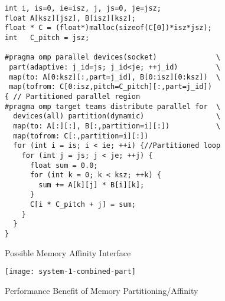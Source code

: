 \begin{figure}
  \begin{verbatim}
int i, is=0, ie=isz, j, js=0, je=jsz;
float A[ksz][jsz], B[isz][ksz];
float * C = (float*)malloc(sizeof(C[0])*isz*jsz);
int   C_pitch = jsz;

#pragma omp parallel devices(socket)              \
 part(adaptive: j_id=js; j_id<je; ++j_id)         \
 map(to: A[0:ksz][:,part=j_id], B[0:isz][0:ksz])  \
 map(tofrom: C[0:isz,pitch=C_pitch][:,part=j_id])
{ // Partitioned parallel region
#pragma omp target teams distribute parallel for  \
  devices(all) partition(dynamic)                 \
  map(to: A[:][:], B[:,partition=i][:])           \
  map(tofrom: C[:,partition=i][:])
  for (int i = is; i < ie; ++i) {//Partitioned loop
    for (int j = js; j < je; ++j) {
      float sum = 0.0;
      for (int k = 0; k < ksz; ++k) {
        sum += A[k][j] * B[i][k];
      }
      C[i * C_pitch + j] = sum;
    }
  }
}
\end{verbatim}
\caption{Possible Memory Affinity Interface\label{fig:atsar-gemm}}
\end{figure}

\begin{figure*}[t]
        \texttt{[image: system-1-combined-part]}
        \caption{Performance Benefit of Memory Partitioning/Affinity\label{fig:atsar-perf}}
\end{figure*}


